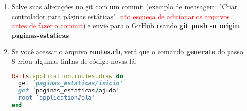 \documentclass[a4paper,12pt]{article}
\begin{document}
\begin{enumerate}
  \item Salve suas alterações no git com um commit (exemplo de mensagem: "Criar controlador para páginas estáticas", \textcolor{red}{não esqueça de adicionar os arquivos antes de fazer o commit}) e envie para o GitHub usando \textbf{git push -u origin paginas-estaticas}
  \item Se você acessar o arquivo \textbf{routes.rb}, verá que o comando \textbf{generate} do passo 8 criou algumas linhas de código novas lá.

  \begin{lstlisting}[language=Ruby, title=config/routes.rb]
Rails.application.routes.draw do
  get `paginas_estaticas/inicio'
  get `paginas_estaticas/ajuda'
  root `application#ola'
end
  \end{lstlisting}


\end{enumerate}
\end{document}
